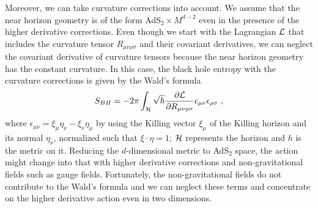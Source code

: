 \documentclass[12pt]{article}
\def\ep{{\epsilon}}
\def\frac#1#2{{#1\over #2}}
\def\s{\sqrt}
\def\de{\partial}
\def\f {\frac}
\def\ep{\epsilon}
\def\ep{{\epsilon}}
\def\frac#1#2{{#1\over #2}}
\def\s{\sqrt}
\begin{document}
Moreover, we can take curvature corrections into
account. We assume that the near horizon geometry is of the form
AdS$_2 \times M^{d-2}$ even in the presence of the higher derivative corrections.
Even though we start with the Lagrangian
${\cal L}$ that includes the curvature tensor $R_{\mu\nu\rho\sigma}$
and their covariant derivatives, we can neglect the covariant
derivative of curvature tensors because the near horizon geometry
has the constant curvature. In this case, the black hole entropy
with the curvature corrections is given by the Wald's formula
\cite{Wa,IyWa,JKM}
\begin{align}
 S_{BH}=-2\pi \int_{{\cal H}}\s{h}\f{\de
{\cal{L}}}{\de R_{\mu\nu\rho\sigma}}\ep_{\mu\nu}\ep_{\rho\sigma}\ ,
\end{align}
where $\ep_{\mu\nu}=\xi_\mu\eta_\nu-\xi_\nu\eta_\mu$
by using
the Killing vector $\xi_\mu$ of the Killing horizon and its normal
$\eta_\nu$, normalized such that $\xi\cdot \eta=1$; ${\cal H}$
represents the horizon and $h$ is the metric on it.
Reducing the $d$-dimensional metric to AdS$_2$ space, the action might change
into that with higher derivative corrections and non-gravitational fields
such as gauge fields. Fortunately, the non-gravitational
fields do not contribute to the Wald's formula and we can neglect these
terms and concentrate on the higher derivative action even in two dimensions.
\end{document}
